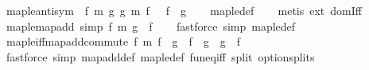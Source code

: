 \begin{isabellebody}
\ map{\isacharunderscore}{\kern0pt}le{\isacharunderscore}{\kern0pt}antisym{\isacharcolon}{\kern0pt}\ {\isachardoublequoteopen}{\isasymlbrakk}\ f\ {\isasymsubseteq}\isactrlsub m\ g{\isacharsemicolon}{\kern0pt}\ g\ {\isasymsubseteq}\isactrlsub m\ f\ {\isasymrbrakk}\ {\isasymLongrightarrow}\ f\ {\isacharequal}{\kern0pt}\ g{\isachardoublequoteclose}\isanewline
%
\isadelimproof
\ \ %
\endisadelimproof
%
\isatagproof
{}\isamarkupfalse%
\ map{\isacharunderscore}{\kern0pt}le{\isacharunderscore}{\kern0pt}def\isanewline
\ \ \isamarkupfalse%
\ {\isacharparenleft}{\kern0pt}metis\ ext\ domIff{\isacharparenright}{\kern0pt}%
\endisatagproof
{\isafoldproof}%
%
\isadelimproof
\isanewline
%
\endisadelimproof
\isanewline
{}\isamarkupfalse%
\ map{\isacharunderscore}{\kern0pt}le{\isacharunderscore}{\kern0pt}map{\isacharunderscore}{\kern0pt}add\ {\isacharbrackleft}{\kern0pt}simp{\isacharbrackright}{\kern0pt}{\isacharcolon}{\kern0pt}\ {\isachardoublequoteopen}f\ {\isasymsubseteq}\isactrlsub m\ g\ {\isacharplus}{\kern0pt}{\isacharplus}{\kern0pt}\ f{\isachardoublequoteclose}\isanewline
%
\isadelimproof
\ \ %
\endisadelimproof
%
\isatagproof
{}\isamarkupfalse%
\ {\isacharparenleft}{\kern0pt}fastforce\ simp{\isacharcolon}{\kern0pt}\ map{\isacharunderscore}{\kern0pt}le{\isacharunderscore}{\kern0pt}def{\isacharparenright}{\kern0pt}%
\endisatagproof
{\isafoldproof}%
%
\isadelimproof
\isanewline
%
\endisadelimproof
\isanewline
{}\isamarkupfalse%
\ map{\isacharunderscore}{\kern0pt}le{\isacharunderscore}{\kern0pt}iff{\isacharunderscore}{\kern0pt}map{\isacharunderscore}{\kern0pt}add{\isacharunderscore}{\kern0pt}commute{\isacharcolon}{\kern0pt}\ {\isachardoublequoteopen}f\ {\isasymsubseteq}\isactrlsub m\ f\ {\isacharplus}{\kern0pt}{\isacharplus}{\kern0pt}\ g\ {\isasymlongleftrightarrow}\ f\ {\isacharplus}{\kern0pt}{\isacharplus}{\kern0pt}\ g\ {\isacharequal}{\kern0pt}\ g\ {\isacharplus}{\kern0pt}{\isacharplus}{\kern0pt}\ f{\isachardoublequoteclose}\isanewline
%
\isadelimproof
\ \ %
\endisadelimproof
%
\isatagproof
{}\isamarkupfalse%
\ {\isacharparenleft}{\kern0pt}fastforce\ simp{\isacharcolon}{\kern0pt}\ map{\isacharunderscore}{\kern0pt}add{\isacharunderscore}{\kern0pt}def\ map{\isacharunderscore}{\kern0pt}le{\isacharunderscore}{\kern0pt}def\ fun{\isacharunderscore}{\kern0pt}eq{\isacharunderscore}{\kern0pt}iff\ split{\isacharcolon}{\kern0pt}\ option{\isachardot}{\kern0pt}splits{\isacharparenright}{\kern0pt}%
\endisatagproof
{\isafoldproof}%
%
\isadelimproof
\isanewline
%
\endisadelimproof
\isanewline

\end{isabellebody}
